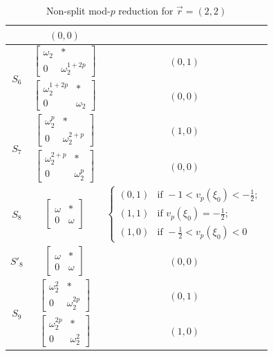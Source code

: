 \documentclass[11pt]{amsart}
\theoremstyle{definition}
\numberwithin{equation}{subsection}
\theoremstyle{plain}
\theoremstyle{plain}
\theoremstyle{plain}
\theoremstyle{plain}
\theoremstyle{plain}
\theoremstyle{plain}
\theoremstyle{plain}
\theoremstyle{plain}
\theoremstyle{plain}
\theoremstyle{plain}
\theoremstyle{plain}
\theoremstyle{plain}
\theoremstyle{definition}
\theoremstyle{definition}
\theoremstyle{definition}
\theoremstyle{remark}
\renewcommand{\(}{\textup{(}}
\renewcommand{\)}{\textup{)}}
\newcommand{\vr}{\vec{r}}
\begin{document}
\begin{table}[htbp]
\begin{tabular}{|c||c|c|}
            & $(0,0)$ \\\hline
    \multirow{2}{*}[-0.5em]{$S_6$}
            & $
            \begin{bmatrix}
                \omega_2 & * \\ 0 & \omega_2^{1+2p}
            \end{bmatrix}$
            & $(0,1)$\\\cline{2-3}
            & $
            \begin{bmatrix}
                \omega_2^{1+2p} & * \\ 0 & \omega_2
            \end{bmatrix}$
            & $(0,0)$ \\\hline
    \multirow{2}{*}[-0.5em]{$S_7$}
            & $
            \begin{bmatrix}
                \omega_2^p & * \\ 0 & \omega_2^{2+p}
            \end{bmatrix}$
            & $(1,0)$\\\cline{2-3}
            & $
            \begin{bmatrix}
                \omega_2^{2+p} & * \\ 0 & \omega_2^p
            \end{bmatrix}$
            & $(0,0)$ \\\hline
    $S_8$
        & $
        \begin{bmatrix}
            \omega & * \\ 0 & \omega
        \end{bmatrix}
        $
        & $
        \begin{cases}
            (0,1) &\mbox{if }-1<v_p(\xi_0)<-\frac{1}{2};\\
            (1,1) &\mbox{if } v_p(\xi_0)=-\frac{1}{2};\\
            (1,0) &\mbox{if } -\frac{1}{2}<v_p(\xi_0)<0
        \end{cases}$
        \\\hline
    $S'_8$
        & $
        \begin{bmatrix}
            \omega & * \\ 0 & \omega
        \end{bmatrix}$
        & $(0,0)$ \\\hline
    \multirow{2}{*}[-0.5em]{$S_9$}
            & $
            \begin{bmatrix}
                \omega_2^2 & * \\ 0 & \omega_2^{2p}
            \end{bmatrix}$
            & $(0,1)$\\\cline{2-3}
            & $
            \begin{bmatrix}
                \omega_2^{2p} & * \\ 0 & \omega_2^2
            \end{bmatrix}$
            & $(1,0)$ \\
        \hline
    \end{tabular}
    \caption{Non-split mod-$p$ reduction for $\vr=(2,2)$}
    \label{tab:summary for vr=(2,2)}
\end{table}
\end{document}
